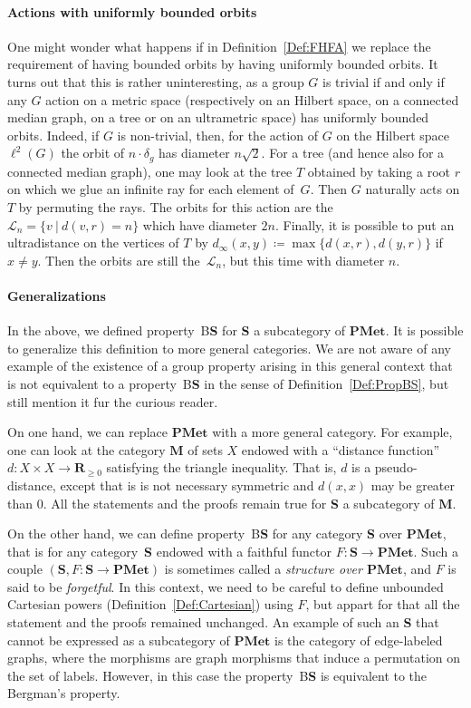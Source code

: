 \documentclass[a4paper]{article}
\theoremstyle{definition}
\newtheorem{rem}[lem]{Remark}
\newcommand*{\field}[1]{\mathbf{#1}}
\newcommand*{\category}[1]{\textbf{#1}}
\newcommand*{\PMet}{\category{PMet}}
\newcommand*{\CatS}{\category{S}}
\newcommand*{\R}{\field{R}}
\newcommand*{\BS}{B\textbf{S}}
\newcommand{\setst}[2]{\{#1\ |\ #2\}}
\begin{document}
\paragraph{Actions with uniformly bounded orbits}
One might wonder what happens if in Definition~\ref{Def:FHFA} we replace the requirement of having bounded orbits by having uniformly bounded orbits.
It turns out that this is rather uninteresting, as a group $G$ is trivial if and only if any $G$ action on a metric space (respectively on an Hilbert space, on a connected median graph, on a tree or on an ultrametric space) has uniformly bounded orbits.
Indeed, if $G$ is non-trivial, then, for the action of $G$ on the Hilbert space $\ell^2(G)$ the orbit of $n\cdot \delta_g$ has diameter $n\sqrt2$.
For a tree (and hence also for a connected median graph), one may look at the tree $T$ obtained by taking a root $r$ on which we glue an infinite ray for each element of~$G$.
Then $G$ naturally acts on $T$ by permuting the rays.
The orbits for this action are the $\mathcal L_n=\setst{v}{d(v,r)=n}$ which have diameter $2n$.
Finally, it is possible to put an ultradistance on the vertices of $T$ by  $d_\infty(x,y)\coloneqq\max\{d(x,r),d(y,r)\}$ if $x\neq y$.
Then the orbits are still the~$\mathcal L_n$, but this time with diameter $n$.
%
%
%
\paragraph{Generalizations}
In the above, we defined property~\BS{} for \CatS{} a subcategory of $\PMet$.
It is possible to generalize this definition to more general categories.
We are not aware of any example of the existence of a group property arising in this general context that is not equivalent to a property~\BS{} in the sense of Definition~\ref{Def:PropBS}, but still mention it fur the curious reader.

On one hand, we can replace $\PMet$ with a more general category.
For example, one can look at the category $\category{M}$ of sets $X$ endowed with a ``distance function'' $d\colon X\times X\to\R_{\geq 0}$ satisfying the triangle inequality.
That is, $d$ is a pseudo-distance, except that is is not necessary symmetric and $d(x,x)$ may be greater than $0$.
All the statements and the proofs remain true for \CatS{} a subcategory of $\category{M}$.

On the other hand, we can define property~\BS{} for any category \CatS{} over $\PMet$, that is for any category~\CatS{} endowed with a faithful functor $F\colon\CatS\to \PMet$.
Such a couple $(\CatS,F\colon\CatS\to \PMet)$ is sometimes called a \emph{structure over $\PMet$}, and $F$ is said to be \emph{forgetful}.
In this context, we need to be careful to define unbounded Cartesian powers (Definition~\ref{Def:Cartesian}) using $F$, but appart for that all the statement and the proofs remained unchanged.
An example of such an \CatS{} that cannot be expressed as a subcategory of $\PMet$ is the category of edge-labeled graphs, where the morphisms are graph morphisms that induce a permutation on the set of labels.
However, in this case the property~\BS{} is equivalent to the Bergman's property.
\end{document}
